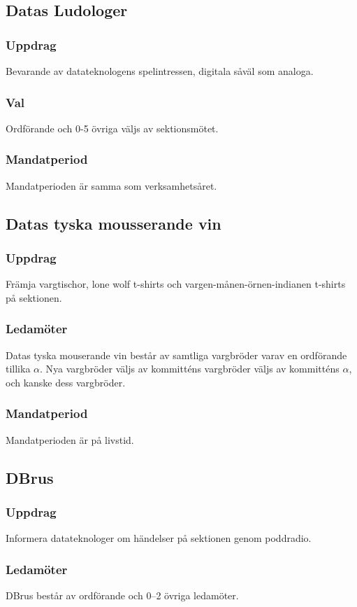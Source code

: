 \subsection{Datas Ludologer}
\subsubsection{Uppdrag}
Bevarande av datateknologens spelintressen, digitala såväl som analoga.
\subsubsection{Val}
Ordförande och 0-5 övriga väljs av sektionsmötet.
\subsubsection{Mandatperiod}
Mandatperioden är samma som verksamhetsåret. 

\subsection{Datas tyska mousserande vin}
\subsubsection{Uppdrag}
Främja vargtischor, lone wolf t-shirts och vargen-månen-örnen-indianen t-shirts på sektionen.
\subsubsection{Ledamöter}
Datas tyska mouserande vin består av samtliga vargbröder varav en ordförande tillika $\alpha$. Nya vargbröder väljs av kommitténs vargbröder väljs av kommitténs $\alpha$, och kanske dess vargbröder.
\subsubsection{Mandatperiod}
Mandatperioden är på livstid.

\subsection{DBrus}
\subsubsection{Uppdrag}
Informera datateknologer om händelser på sektionen genom poddradio.
\subsubsection{Ledamöter}
DBrus består av ordförande och 0--2 övriga ledamöter.
